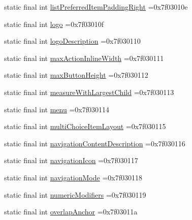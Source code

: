 \begin{DoxyCompactItemize}
\item 
static final int \mbox{\hyperlink{classcom_1_1example_1_1trainawearapplication_1_1_r_1_1attr_a3bfddaccd571f6c1ee19df0ccf47c68b}{list\+Preferred\+Item\+Padding\+Right}} =0x7f03010e
\item 
static final int \mbox{\hyperlink{classcom_1_1example_1_1trainawearapplication_1_1_r_1_1attr_a9f9dca4b8651ad25f8ee810f810b7188}{logo}} =0x7f03010f
\item 
static final int \mbox{\hyperlink{classcom_1_1example_1_1trainawearapplication_1_1_r_1_1attr_a5cea25ad96a18b31dfc7356967538d3f}{logo\+Description}} =0x7f030110
\item 
static final int \mbox{\hyperlink{classcom_1_1example_1_1trainawearapplication_1_1_r_1_1attr_a388991765c2fff242ef4ce3213ed5bf0}{max\+Action\+Inline\+Width}} =0x7f030111
\item 
static final int \mbox{\hyperlink{classcom_1_1example_1_1trainawearapplication_1_1_r_1_1attr_a4c5e02e478aa92c377c59300cb3fe42e}{max\+Button\+Height}} =0x7f030112
\item 
static final int \mbox{\hyperlink{classcom_1_1example_1_1trainawearapplication_1_1_r_1_1attr_a7c9cba83ce87d751598db498dbab69b2}{measure\+With\+Largest\+Child}} =0x7f030113
\item 
static final int \mbox{\hyperlink{classcom_1_1example_1_1trainawearapplication_1_1_r_1_1attr_a7bf0fad85d31059368ab00b7130a1bdf}{menu}} =0x7f030114
\item 
static final int \mbox{\hyperlink{classcom_1_1example_1_1trainawearapplication_1_1_r_1_1attr_a91edfc3215b85f71210a803a6d8accbb}{multi\+Choice\+Item\+Layout}} =0x7f030115
\item 
static final int \mbox{\hyperlink{classcom_1_1example_1_1trainawearapplication_1_1_r_1_1attr_a05e4b01fb1ae2e7c167c60a9f1691c33}{navigation\+Content\+Description}} =0x7f030116
\item 
static final int \mbox{\hyperlink{classcom_1_1example_1_1trainawearapplication_1_1_r_1_1attr_af1c806903f1c7e9e81cc5f7a8687ce01}{navigation\+Icon}} =0x7f030117
\item 
static final int \mbox{\hyperlink{classcom_1_1example_1_1trainawearapplication_1_1_r_1_1attr_a44ddc1f3897306c7893cf19273a9711e}{navigation\+Mode}} =0x7f030118
\item 
static final int \mbox{\hyperlink{classcom_1_1example_1_1trainawearapplication_1_1_r_1_1attr_a2a27937dc6d7ddeb8469614eb7cd1b81}{numeric\+Modifiers}} =0x7f030119
\item 
static final int \mbox{\hyperlink{classcom_1_1example_1_1trainawearapplication_1_1_r_1_1attr_a49eb5ef78fe093f4bc28fee24f161a12}{overlap\+Anchor}} =0x7f03011a

\end{DoxyCompactItemize}
